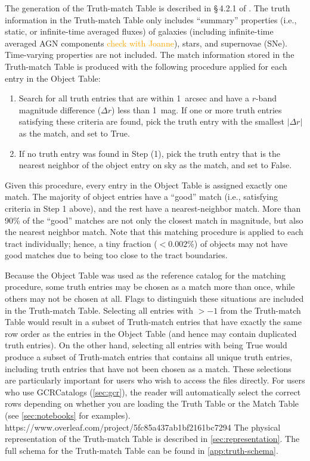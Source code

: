 \documentclass[modern]{descnote}
\newcommand{\todo}[1]{\textcolor{orange}{#1}}
\begin{document}
The generation of the Truth-match Table is described in \S\,4.2.1 of \cite{2020arXiv201005926L}. The truth information in the Truth-match Table only includes ``summary'' properties (i.e., static, or infinite-time averaged fluxes) of galaxies (including infinite-time averaged AGN components \todo{check with Joanne}), stars, and supernovae (SNe). Time-varying properties are not included. The match information stored in the  Truth-match Table is produced with the following procedure applied for each entry in the Object Table:
\begin{enumerate}
    \item Search for all truth entries that are within 1~arcsec and have a $r$-band magnitude difference ($\Delta r$) less than 1~mag. If one or more truth entries satisfying these criteria are found, pick the truth entry with the smallest $|\Delta r|$ as the match, and set  to True.
    \item If no truth entry was found in Step (1), pick the truth entry that is the nearest neighbor of the object entry on sky as the match, and set  to False.
\end{enumerate}
Given this procedure, every entry in the Object Table is assigned exactly one match. The majority of object entries have a ``good'' match (i.e., satisfying criteria in Step 1 above), and the rest have a nearest-neighbor match. More than 90\% of the ``good'' matches are not only the closest match in magnitude, but also the nearest neighbor match. 
Note that this matching procedure is applied to each tract individually; hence, a tiny fraction ($<0.002\%$) of objects may not have good matches due to being too close to the tract boundaries. 

Because the Object Table was used as the reference catalog for the matching procedure, some truth entries may be chosen as a match more than once, while others may not be chosen at all.
Flags to distinguish these situations are included in the Truth-match Table. 
Selecting all entries with  $> -1$ from the Truth-match Table would result in a subset of Truth-match entries that have exactly the same row order as the entries in the Object Table (and hence may contain duplicated truth entries). On the other hand, selecting all entries with  being True would produce a subset of Truth-match entries that contains all unique truth entries, including truth entries that have not been chosen as a match.
These selections are particularly important for users who wish to access the files directly. For users who use GCRCatalogs (\autoref{sec:gcr}), the reader will automatically select the correct rows depending on whether you are loading the Truth Table or the Match Table (see \autoref{sec:notebooks} for examples).
https://www.overleaf.com/project/5fc85a437ab1bf2161bc7294
The physical representation of the Truth-match Table is described in \autoref{sec:representation}. The full schema for the Truth-match Table can be found in \autoref{app:truth-schema}.
\end{document}
